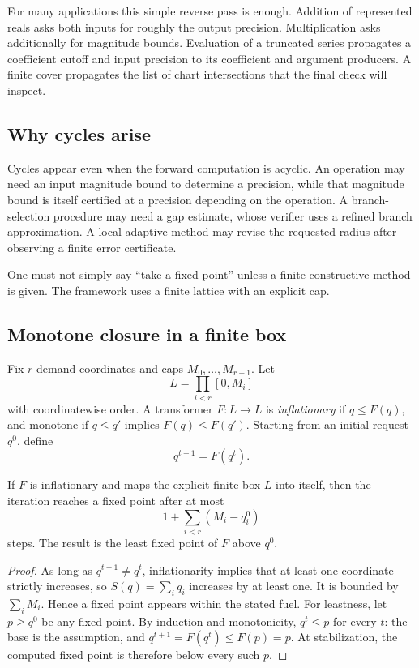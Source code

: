 For many applications this simple reverse pass is enough.  Addition of represented reals asks both inputs
for roughly the output precision.  Multiplication asks additionally for magnitude bounds.  Evaluation of a
truncated series propagates a coefficient cutoff and input precision to its coefficient and argument
producers.  A finite cover propagates the list of chart intersections that the final check will inspect.

\subsection{Why cycles arise}

Cycles appear even when the forward computation is acyclic.  An operation may need an input magnitude bound
to determine a precision, while that magnitude bound is itself certified at a precision depending on the
operation.  A branch-selection procedure may need a gap estimate, whose verifier uses a refined branch
approximation.  A local adaptive method may revise the requested radius after observing a finite error
certificate.

One must not simply say ``take a fixed point'' unless a finite constructive method is given.  The framework
uses a finite lattice with an explicit cap.

\subsection{Monotone closure in a finite box}

Fix \(r\) demand coordinates and caps \(M_0,\ldots,M_{r-1}\).  Let
\[
 L=\prod_{i<r}[0,M_i]
\]
with coordinatewise order.  A transformer \(F:L\to L\) is
\emph{inflationary} if \(q\le F(q)\), and monotone if \(q\le q'\) implies
\(F(q)\le F(q')\).  Starting from an initial request \(q^0\), define
\[
 q^{t+1}=F(q^t).
\]

\begin{theorem}
\label{thm:demand-closure}
If \(F\) is inflationary and maps the explicit finite box \(L\) into itself, then the iteration reaches a
fixed point after at most
\[
  1+\sum_{i<r}(M_i-q_i^0)
\]
steps.  The result is the least fixed point of \(F\) above \(q^0\).
\end{theorem}

\begin{proof}
As long as \(q^{t+1}\ne q^t\), inflationarity implies that at least one coordinate strictly increases, so
\(
 S(q)=\sum_i q_i
\)
increases by at least one.  It is bounded by \(\sum_i M_i\).  Hence a fixed point appears within the stated
fuel.  For leastness, let \(p\ge q^0\) be any fixed point.  By induction and monotonicity,
\(q^t\le p\) for every \(t\): the base is the assumption, and
\(q^{t+1}=F(q^t)\le F(p)=p\).  At stabilization, the computed fixed point is therefore below every such
\(p\).
\end{proof}


